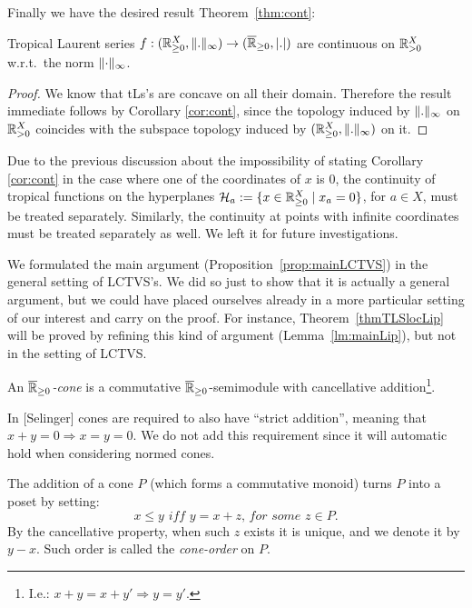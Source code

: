 Finally we have the desired result Theorem~\ref{thm:cont}:

\begin{theorem}
 Tropical Laurent series $f:({\mathbb{R}}_{\geq 0}^X,\lVert.\rVert_\infty) \to (\overline{\mathbb{R}}_{\geq 0},\left\lvert.\right\rvert)$ are continuous on ${\mathbb{R}}_{> 0}^X$ w.r.t.\ the norm $\lVert\cdot\rVert_\infty$.
\end{theorem}
\begin{proof}
 We know that tLs's are concave on all their domain.
 Therefore the result immediate follows by Corollary \ref{cor:cont}, since the topology induced by $\lVert.\rVert_\infty$ on ${\mathbb{R}}_{> 0}^X$ coincides with the subspace topology induced by $({\mathbb{R}}_{\geq 0}^X,\lVert.\rVert_\infty)$ on it.
\end{proof}

Due to the previous discussion about the impossibility of stating Corollary \ref{cor:cont} in the case where one of the coordinates of $x$ is $0$, the continuity of tropical functions on the hyperplanes $\mathcal H_a:=\{x\in {\mathbb{R}}_{\geq 0}^X \mid x_a=0\}$, for $a\in X$, must be treated separately.
Similarly, the continuity at points with infinite coordinates must be treated separately as well.
We left it for future investigations.

\begin{remark}
 We formulated the main argument (Proposition~\ref{prop:mainLCTVS}) in the general setting of LCTVS's.
We did so just to show that it is actually a general argument, but we could have placed ourselves already in a more particular setting of our interest and carry on the proof.
For instance, Theorem~\ref{thmTLSlocLip} will be proved by refining this kind of argument (Lemma~\ref{lm:mainLip}), but not in the setting of LCTVS.
\end{remark} 

\newpage

\begin{definition}
 An \emph{$\overline{\mathbb{R}}_{\geq 0}$-cone} is a commutative $\overline{\mathbb{R}}_{\geq 0}$-semimodule with cancellative addition\footnote{I.e.: $x+y=x+y' \Rightarrow y=y'$.}.
\end{definition}

In [Selinger] cones are required to also have ``strict addition'', meaning that $x+y=0 \Rightarrow x=y=0$.
We do not add this requirement since it will automatic hold when considering normed cones.

\begin{remark}
 The addition of a cone $P$ (which forms a commutative monoid) turns $P$ into a poset by setting:
 \[
  x \leq y \textit{ iff } y=x+z \textit{, for some }z\in P.
 \]
 By the cancellative property, when such $z$ exists it is unique, and we denote it by $y-x$.
 Such order is called the \emph{cone-order} on $P$.
\end{remark}

